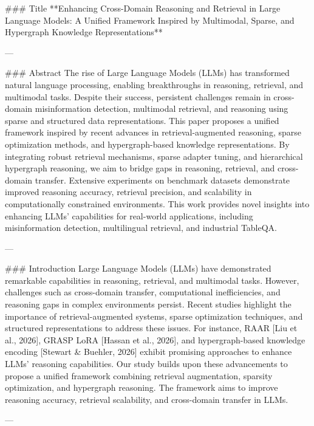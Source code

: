 ### Title
**Enhancing Cross-Domain Reasoning and Retrieval in Large Language Models: A Unified Framework Inspired by Multimodal, Sparse, and Hypergraph Knowledge Representations**

---

### Abstract
The rise of Large Language Models (LLMs) has transformed natural language processing, enabling breakthroughs in reasoning, retrieval, and multimodal tasks. Despite their success, persistent challenges remain in cross-domain misinformation detection, multimodal retrieval, and reasoning using sparse and structured data representations. This paper proposes a unified framework inspired by recent advances in retrieval-augmented reasoning, sparse optimization methods, and hypergraph-based knowledge representations. By integrating robust retrieval mechanisms, sparse adapter tuning, and hierarchical hypergraph reasoning, we aim to bridge gaps in reasoning, retrieval, and cross-domain transfer. Extensive experiments on benchmark datasets demonstrate improved reasoning accuracy, retrieval precision, and scalability in computationally constrained environments. This work provides novel insights into enhancing LLMs' capabilities for real-world applications, including misinformation detection, multilingual retrieval, and industrial TableQA.

---

### Introduction
Large Language Models (LLMs) have demonstrated remarkable capabilities in reasoning, retrieval, and multimodal tasks. However, challenges such as cross-domain transfer, computational inefficiencies, and reasoning gaps in complex environments persist. Recent studies highlight the importance of retrieval-augmented systems, sparse optimization techniques, and structured representations to address these issues. For instance, RAAR [Liu et al., 2026], GRASP LoRA [Hassan et al., 2026], and hypergraph-based knowledge encoding [Stewart & Buehler, 2026] exhibit promising approaches to enhance LLMs' reasoning capabilities. Our study builds upon these advancements to propose a unified framework combining retrieval augmentation, sparsity optimization, and hypergraph reasoning. The framework aims to improve reasoning accuracy, retrieval scalability, and cross-domain transfer in LLMs.

---

